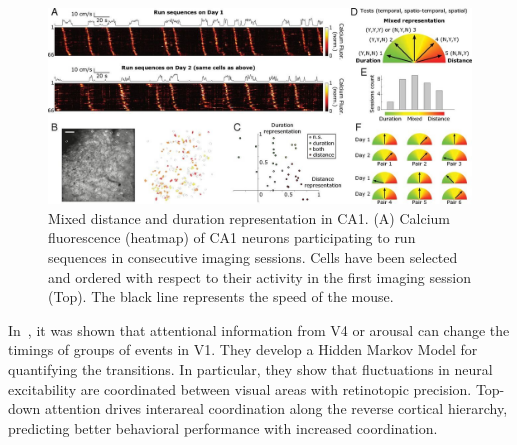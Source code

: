 \documentclass[brainsci, %
               review,submit,pdftex,moreauthors%
               ]{Definitions/mdpi}
\begin{document}
\begin{figure}
\centering
\includegraphics{figures/haimerl2019.jpg}
\caption{
Mixed distance and duration representation in CA1. (A) Calcium fluorescence (heatmap) of CA1 neurons participating to run sequences in consecutive imaging sessions. Cells have been selected and ordered with respect to their activity in the first imaging session (Top). The black line represents the speed of the mouse.}\label{fig:haimerl}
\end{figure}



In~\citep{van_kempen_top-down_2021}, it was shown that attentional information from V4 or arousal can change the timings of groups of events in V1. They develop a Hidden Markov Model for quantifying the transitions. In particular, they show that fluctuations in neural excitability are coordinated between visual areas with retinotopic precision. Top-down attention drives interareal coordination along the reverse cortical hierarchy, predicting better behavioral performance with increased coordination.
\end{document}
